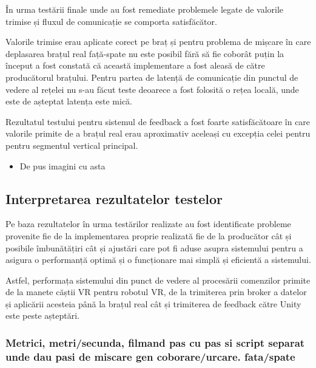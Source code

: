 În urma testării finale unde au fost remediate problemele legate de valorile trimise și fluxul de comunicație se comporta satisfăcător.

Valorile trimise erau aplicate corect pe braț și pentru problema  de mișcare în care deplasarea brațul real  față-spate nu este posibil fără să fie coborât puțin la început a fost constată că această implementare a fost aleasă  de către producătorul brațului. Pentru partea de latență de comunicație din punctul de vedere al rețelei nu s-au făcut teste deoarece a fost folosită o rețea locală, unde este de așteptat latența este mică.

Rezultatul testului pentru sistemul de feedback a fost foarte satisfăcătoare în care valorile primite de a brațul real erau aproximativ aceleași cu excepția celei pentru pentru segmentul vertical principal.


\begin{itemize}
	\item De pus imagini cu asta
\end{itemize}

\subsection{Interpretarea rezultatelor testelor}
Pe baza rezultatelor în urma testărilor realizate au fost identificate probleme provenite fie de la implementarea proprie realizată fie de la producător cât și posibile îmbunătățiri cât și ajustări care pot fi aduse asupra sistemului pentru a asigura o performanță optimă și o funcționare mai simplă și eficientă a sistemului.

Astfel, performața sistemului din punct de vedere al procesării comenzilor primite de la manete căștii VR pentru robotul VR, de la trimiterea prin broker a datelor și aplicării acesteia până la brațul real cât și trimiterea de feedback către Unity este peste așteptări.





\subsubsection{Metrici, metri/secunda, filmand pas cu pas si script separat unde dau pasi de miscare gen coborare/urcare. fata/spate}

